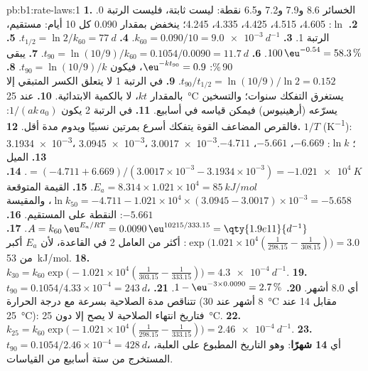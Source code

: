 \begin{solution}{pb:b1:rate-laws:1}
\textbf{1.} الخسائر 8.6 و7.9 و7.2 و6.5 نقطة: ليست ثابتة، فليست
الرتبة 0.
\textbf{2.} $\ln$: 4.605، 4.515، 4.425، 4.335، 4.245؛ ينخفض بمقدار 0.090
كل 10 أيام: مستقيم، الرتبة 1.
\textbf{3.} $k_{60} = 0.090/10 = \qty{9.0e-3}{d^{-1}}$.
\textbf{4.} $t_{1/2} = \ln2/k_{60} = \qty{77}{d}$.
\textbf{5.} $100\,\eu^{-0.54} = 58.3\,\%$.
\textbf{6.} $t_{90} = \ln(10/9)/k_{60} = 0.1054/0.0090 = \qty{11.7}{d}$.
\textbf{7.} يبقى 90\,\%: $\eu^{-kt_{90}} = 0.9$، فيكون $t_{90} = \ln(10/9)/k$.
\textbf{8.} $t_{90}/t_{1/2} = \ln(10/9)/\ln2 = 0.152$.
\textbf{9.} في الرتبة 1 لا يتعلق الكسر المتبقي إلا بالمقدار $kt$، لا
بالكمية الابتدائية.
\textbf{10.} عند \qty{25}{\celsius} يستغرق التفكك سنوات؛ والتسخين
يسرّعه (أرهينيوس) فيمكن قياسه في أسابيع.
\textbf{11.} في الرتبة 2 يكون  $1/(ak\,a_0)$: فالقرص المضاعف
القوة يتفكك أسرع بمرتين نسبيًا ويدوم مدة أقل.
\textbf{12.} $1/T$ (\unit{K^{-1}}): \num{3.1934e-3}، \num{3.0945e-3}،
\num{3.0017e-3}؛ $\ln k$: $-6.669$، $-5.661$، $-4.711$.
\textbf{13.} الميل $= (-4.711 + 6.669)/(3.0017 \times 10^{-3} - 3.1934 \times
10^{-3}) = \qty{-1.021e4}{K}$.
\textbf{14.} $E_a = 8.314 \times 1.021 \times 10^4 = \qty{85}{kJ/mol}$.
\textbf{15.} القيمة المتوقعة $\ln k_{50} = -4.711 - 1.021 \times 10^4 \times (3.0945 -
3.0017) \times 10^{-3} = -5.658$، والمقيسة $-5.661$: النقطة على المستقيم.
\textbf{16.} $A = k_{60}\,\eu^{E_a/RT} = 0.0090\,\eu^{10215/333.15} =
\qty{1.9e11}{d^{-1}}$.
\textbf{17.} $\exp\big(1.021 \times 10^4(\frac{1}{298.15} -
\frac{1}{308.15})\big) = 3.0$: أكثر من العامل 2 في القاعدة، لأن
$E_a$ أكبر من \qty{53}{kJ/mol}.
\textbf{18.} $k_{30} = k_{60}\exp\big(-1.021 \times 10^4(\frac{1}{303.15} -
\frac{1}{333.15})\big) = \qty{4.3e-4}{d^{-1}}$.
\textbf{19.} $t_{90} = 0.1054/4.33 \times 10^{-4} = \qty{243}{d}$، أي 8.0
أشهر.
\textbf{20.} $1 - \eu^{-3 \times 0.0090} = 2.7\,\%$.
\textbf{21.} تتناقص مدة الصلاحية بسرعة مع درجة الحرارة (8 أشهر عند
\qty{30}{\celsius} مقابل 14 عند \qty{25}{\celsius}): فتاريخ انتهاء الصلاحية
لا يصح إلا دون \qty{25}{\celsius}.
\textbf{22.} $k_{25} = k_{60}\exp\big(-1.021 \times 10^4(\frac{1}{298.15} -
\frac{1}{333.15})\big) = \qty{2.46e-4}{d^{-1}}$.
\textbf{23.} $t_{90} = 0.1054/2.46 \times 10^{-4} = \qty{428}{d}$، أي
\textbf{14 شهرًا}: وهو التاريخ المطبوع على العلبة، المستخرج من ستة
أسابيع من القياسات.
\end{solution}
